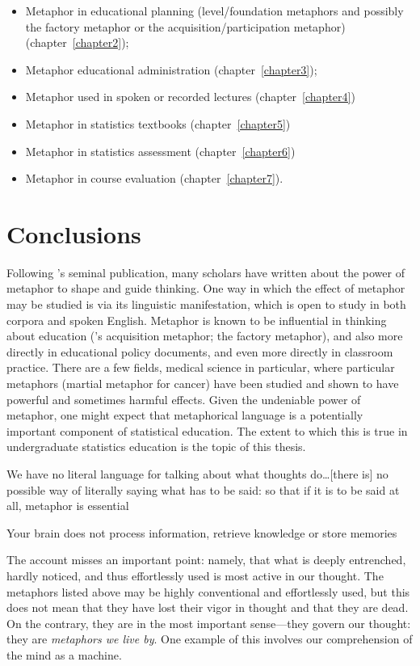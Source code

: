 \begin{itemize}
\item Metaphor in educational planning (level/foundation metaphors and
  possibly the factory metaphor or the acquisition/participation
  metaphor) (chapter~\ref{chapter2});
\item Metaphor educational administration (chapter~\ref{chapter3});
\item Metaphor used in spoken or recorded lectures (chapter~\ref{chapter4})
\item Metaphor in statistics textbooks (chapter~\ref{chapter5})
\item Metaphor in statistics assessment (chapter~\ref{chapter6})
\item Metaphor in course evaluation (chapter~\ref{chapter7}).
\end{itemize}


\section{Conclusions}

Following \citeauthor{lakoff1980}'s seminal publication, many scholars
have written about the power of metaphor to shape and guide thinking.
One way in which the effect of metaphor may be studied is via its
linguistic manifestation, which is open to study in both corpora and
spoken English.  Metaphor is known to be influential in thinking about
education (\cite{sfard1998}'s acquisition metaphor; the factory
metaphor), and also more directly in educational policy documents, and
even more directly in classroom practice.  There are a few fields,
medical science in particular, where particular metaphors (martial
metaphor for cancer) have been studied and shown to have powerful and
sometimes harmful effects.  Given the undeniable power of metaphor,
one might expect that metaphorical language is a potentially important
component of statistical education.  The extent to which this is true
in undergraduate statistics education is the topic of this thesis.

\begin{singlespace}
\epigraph{We have no literal language for talking about what
  thoughts do\ldots [there is] no possible way of literally saying
  what has to be said: so that if it is to be said at all, metaphor
  is essential}{}

\epigraph{Your brain does not process information, retrieve knowledge
  or store memories}{}

\epigraph{The  account misses an important
  point: namely, that what is deeply entrenched, hardly noticed, and
  thus effortlessly used is most active in our thought.  The metaphors
  listed above may be highly conventional and effortlessly used, but
  this does not mean that they have lost their vigor in thought and
  that they are dead.  On the contrary, they are  in the
  most important sense---they govern our thought: they are
  \emph{metaphors we live by}.  One example of this involves our
  comprehension of the mind as a machine.}{}


\end{singlespace}
